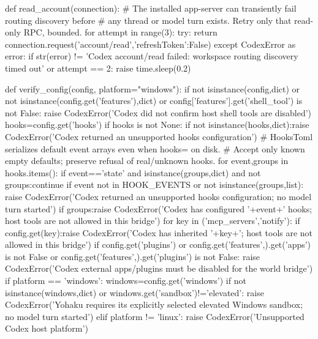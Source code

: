 def read_account(connection):
    # The installed app-server can transiently fail routing discovery before
    # any thread or model turn exists. Retry only that read-only RPC, bounded.
    for attempt in range(3):
        try:
            return connection.request('account/read',{'refreshToken':False})
        except CodexError as error:
            if str(error) != 'Codex account/read failed: workspace routing discovery timed out' or attempt == 2:
                raise
            time.sleep(0.2)


def verify_config(config, platform="windows"):
    if not isinstance(config,dict) or not isinstance(config.get('features'),dict) or config['features'].get('shell_tool') is not False:
        raise CodexError('Codex did not confirm host shell tools are disabled')
    hooks=config.get('hooks')
    if hooks is not None:
        if not isinstance(hooks,dict):raise CodexError('Codex returned an unsupported hooks configuration')
        # HooksToml serializes default event arrays even when hooks={} on disk.
        # Accept only known empty defaults; preserve refusal of real/unknown hooks.
        for event,groups in hooks.items():
            if event=='state' and isinstance(groups,dict) and not groups:continue
            if event not in HOOK_EVENTS or not isinstance(groups,list):
                raise CodexError('Codex returned an unsupported hooks configuration; no model turn started')
            if groups:raise CodexError('Codex has configured '+event+' hooks; host tools are not allowed in this bridge')
    for key in ('mcp_servers','notify'):
        if config.get(key):raise CodexError('Codex has inherited '+key+'; host tools are not allowed in this bridge')
    if config.get('plugins') or config.get('features',{}).get('apps') is not False or config.get('features',{}).get('plugins') is not False:
        raise CodexError('Codex external apps/plugins must be disabled for the world bridge')
    if platform == 'windows':
        windows=config.get('windows')
        if not isinstance(windows,dict) or windows.get('sandbox')!='elevated':
            raise CodexError('Yohaku requires its explicitly selected elevated Windows sandbox; no model turn started')
    elif platform != 'linux':
        raise CodexError('Unsupported Codex host platform')

